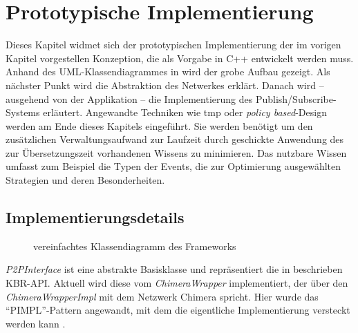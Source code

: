 \chapter{Prototypische Implementierung}
\label{chap:impl}
Dieses Kapitel widmet sich der prototypischen Implementierung der im vorigen Kapitel vorgestellen Konzeption, die als Vorgabe in C++ entwickelt werden muss. Anhand des UML-Klassendiagrammes in  wird der grobe Aufbau gezeigt. Als nächster Punkt wird die Abstraktion des Netwerkes erklärt. Danach wird -- ausgehend von der Applikation -- die Implementierung des Publish/Subscribe-Systems erläutert. Angewandte Techniken wie \ac{tmp} oder \emph{policy based}-Design werden am Ende dieses Kapitels eingeführt. Sie werden benötigt um den zusätzlichen Verwaltungsaufwand zur Laufzeit durch geschickte Anwendung des zur Übersetzungszeit vorhandenen Wissens zu minimieren. Das nutzbare Wissen umfasst zum Beispiel die Typen der Events, die zur Optimierung ausgewählten Strategien und deren Besonderheiten.

\section{Implementierungsdetails}
\label{chap:impl_impl}

\begin{figure}[htbp]
\centering
{}
\caption{vereinfachtes Klassendiagramm des Frameworks}
\label{fig:uml}
\end{figure}

\emph{P2PInterface} ist eine abstrakte Basisklasse und repräsentiert die in \cite{Dabek2003Towards} beschrieben KBR-API. Aktuell wird diese vom \emph{ChimeraWrapper} implementiert, der über den \emph{ChimeraWrapperImpl} mit dem Netzwerk Chimera spricht. Hier wurde das ``PIMPL''-Pattern angewandt, mit dem die eigentliche Implementierung versteckt werden kann \cite{Alexandrescu2001Modern}.

